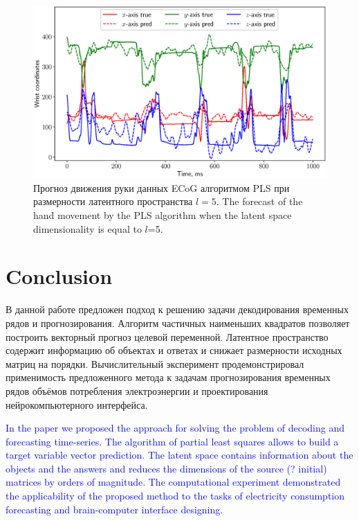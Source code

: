 \documentclass[12pt,twoside]{article}
\begin{document}
\begin{figure}[!h]
	\centering
	\includegraphics[width=\textwidth]{figs/ecog_prediction}
	\caption{Прогноз движения руки данных ECoG алгоритмом PLS при размерности латентного пространства $l=5$. The forecast of 
	the hand movement by the PLS algorithm when the latent space dimensionality is equal to $l$=5.}
	\label{fig::ecog_prediction}
\end{figure}

\section{Conclusion}
В данной работе предложен подход к решению задачи декодирования временных рядов и прогнозирования. 
Алгоритм частичных наименьших квадратов позволяет построить векторный прогноз целевой переменной. 
Латентное пространство содержит информацию об объектах и ответах и снижает размерности исходных матриц на порядки. 
Вычислительный эксперимент продемонстрировал применимость предложенного метода к задачам прогнозирования временных рядов объёмов потребления электроэнергии и проектирования нейрокомпьютерного интерфейса.

\textcolor{blue}{
In the paper we proposed the approach for solving the problem of decoding and forecasting time-series. 
The algorithm of partial least squares allows to build a target variable vector prediction. 
The latent space contains information about the objects and the answers and reduces the dimensions of the source (? initial) matrices by orders of magnitude. 
The computational experiment demonstrated the applicability of the proposed method to the tasks of electricity consumption forecasting and brain-computer interface designing.}




\end{document}
